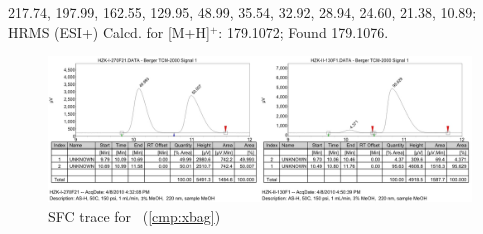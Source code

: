 217.74, 197.99, 162.55, 129.95, 48.99, 35.54, 32.92, 28.94, 24.60, 21.38, 10.89; HRMS (ESI+) Calcd. for  [M+H]$^+$: 179.1072; Found 179.1076.
\begin{figure}[h]
\vspace{10pt}
\centering
\includegraphics[width=5.25in]{chp_singlecarbon/images/sfc/xbag_sfc.jpg}
\caption{SFC trace for \CMPxbag~(\ref{cmp:xbag})}
\vspace{-10pt}
\end{figure}

